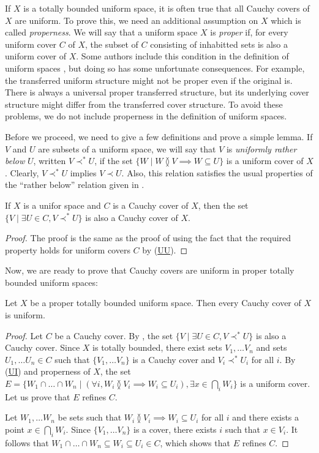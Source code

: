 \documentclass[reqno]{amsart}
\newcommand{\axref}[1]{(\hyperref[ax:#1]{#1})}
\theoremstyle{definition}
\theoremstyle{remark}
\numberwithin{figure}{section}
\newcommand{\overlap}[2]{#1 \between #2}
\newcommand{\rb}{\prec}
\begin{document}
If $X$ is a totally bounded uniform space, it is often true that all Cauchy covers of $X$ are uniform.
To prove this, we need an additional assumption on $X$ which is called \emph{properness}.
We will say that a uniform space $X$ is \emph{proper} if, for every uniform cover $C$ of $X$, the subset of $C$ consisting of inhabitted sets is also a uniform cover of $X$.
Some authors include this condition in the definition of uniform spaces \cite{uniform-locales}, but doing so has some unfortunate consequences.
For example, the transferred uniform structure might not be proper even if the original is.
There is always a universal proper transferred structure, but its underlying cover structure might differ from the transferred cover structure.
To avoid these problems, we do not include properness in the definition of uniform spaces.

Before we proceed, we need to give a few definitions and prove a simple lemma.
If $V$ and $U$ are subsets of a uniform space, we will say that $V$ is \emph{uniformly rather below} $U$,
written $V \rb^* U$, if the set $\{ W \mid \overlap{W}{V} \implies W \subseteq U \}$ is a uniform cover of $X$.
Clearly, $V \rb^* U$ implies $V \rb U$.
Also, this relation satisfies the usual properties of the ``rather below'' relation given in .

\begin{lem}
If $X$ is a unifor space and $C$ is a Cauchy cover of $X$, then the set $\{ V \mid \exists U \in C, V \rb^* U \}$ is also a Cauchy cover of $X$.
\end{lem}
\begin{proof}
The proof is the same as the proof of  using the fact that the required property holds for uniform covers $C$ by \axref{UU}.
\end{proof}

Now, we are ready to prove that Cauchy covers are uniform in proper totally bounded uniform spaces:

\begin{prop}[tb-cauchy]
Let $X$ be a proper totally bounded uniform space.
Then every Cauchy cover of $X$ is uniform.
\end{prop}
\begin{proof}
Let $C$ be a Cauchy cover.
By , the set $\{ V \mid \exists U \in C, V \rb^* U \}$ is also a Cauchy cover.
Since $X$ is totally bounded, there exist sets $V_1, \ldots V_n$ and sets $U_1, \ldots U_n \in C$ such that $\{ V_1, \ldots V_n \}$ is a Cauchy cover and $V_i \rb^* U_i$ for all $i$.
By \axref{UI} and properness of $X$, the set $E = \{ W_1 \cap \ldots \cap W_n \mid (\forall i, \overlap{W_i}{V_i} \implies W_i \subseteq U_i), \exists x \in \bigcap_i W_i \}$ is a uniform cover.
Let us prove that $E$ refines $C$.

Let $W_1, \ldots W_n$ be sets such that $\overlap{W_i}{V_i} \implies W_i \subseteq U_i$ for all $i$ and there exists a point $x \in \bigcap_i W_i$.
Since $\{ V_1, \ldots V_n \}$ is a cover, there exists $i$ such that $x \in V_i$.
It follows that $W_1 \cap \ldots \cap W_n \subseteq W_i \subseteq U_i \in C$, which shows that $E$ refines $C$.
\end{proof}
\end{document}
